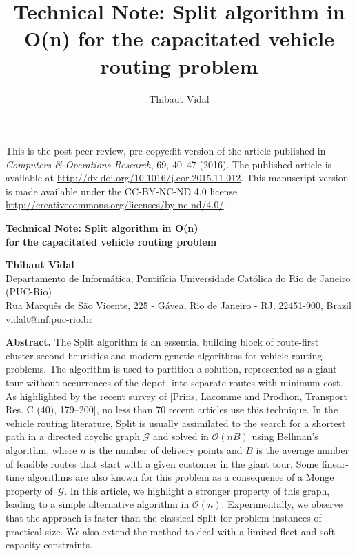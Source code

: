 \documentclass[11pt]{article}
\title{Technical Note: Split algorithm in O(n) for the capacitated vehicle routing problem}
\author{Thibaut Vidal}
\newcommand{\cO}{{\mathcal O}}
\newcommand{\blue}[1]{{#1}}
\begin{document}
\vspace*{-1.8cm}

\begin{scriptsize}
\noindent
This is the post-peer-review, pre-copyedit version of the article published in \emph{Computers \& Operations Research}, 69, 40--47 (2016). The published article is available at \url{http://dx.doi.org/10.1016/j.cor.2015.11.012}. This manuscript version is made available under the CC-BY-NC-ND 4.0 license \url{http://creativecommons.org/licenses/by-nc-nd/4.0/}.\par
\end{scriptsize}

\vspace*{0.8cm}

\begin{center}

\begin{LARGE}
{\textbf{Technical Note: Split algorithm in O(n) \\ \vspace*{0.2cm}  for the \blue{capacitated} vehicle routing  problem}}
\end{LARGE}

\vspace*{1.2cm}

\textbf{Thibaut Vidal} \\
Departamento de Inform\'atica, Pontif\'icia Universidade Cat\'olica do Rio de Janeiro (PUC-Rio) \\
Rua Marqu\^es de S\~ao Vicente, 225 - G\'avea, Rio de Janeiro - RJ, 22451-900, Brazil \\
vidalt@inf.puc-rio.br \\

\vspace*{1cm}

\end{center}
\noindent
\textbf{Abstract.}
The Split algorithm is an essential building block of route-first cluster-second heuristics and modern genetic algorithms for vehicle routing problems. \blue{The algorithm is used to partition a solution, represented as a giant tour without occurrences of the depot, into separate routes with minimum cost.}
As highlighted by the recent survey of [Prins, Lacomme and Prodhon, Transport Res. C (40), 179--200], no less than 70 recent articles use this technique. In the vehicle routing literature, Split is usually assimilated to the search for a shortest path in a directed acyclic graph $\mathcal{G}$ and solved in $\cO(nB)$ using Bellman's algorithm, where $n$ is the number of delivery points and \blue{$B$ is the average number of feasible routes that start with a given customer in the giant tour.}
Some linear-time algorithms are also known for this problem as a consequence of a Monge property of~$\mathcal{G}$. In this article, we highlight a stronger property of this graph, leading to a \blue{simple} alternative algorithm in $\cO(n)$. Experimentally, we observe that the approach is faster than the classical Split for problem instances of practical size. We also extend the method to deal with a limited fleet and soft capacity constraints.
\vspace*{0.3cm}
\end{document}
